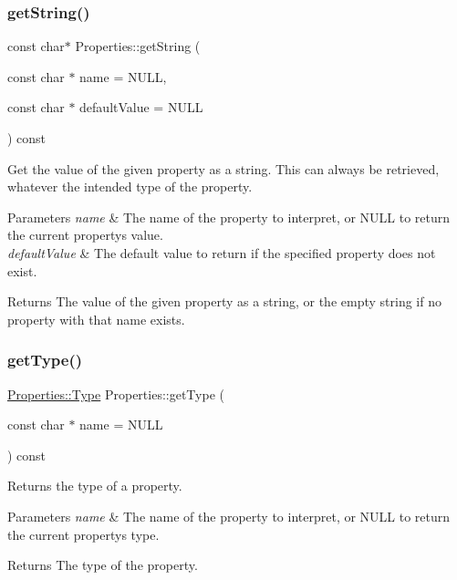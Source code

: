 \subsubsection{\texorpdfstring{get\+String()}{getString()}\hspace{0.1cm}{\footnotesize\ttfamily [2/2]}}
{\footnotesize\ttfamily const char$\ast$ Properties\+::get\+String (\begin{DoxyParamCaption}\item[{const char $\ast$}]{name = {\ttfamily NULL},  }\item[{const char $\ast$}]{default\+Value = {\ttfamily NULL} }\end{DoxyParamCaption}) const}

Get the value of the given property as a string. This can always be retrieved, whatever the intended type of the property.


\begin{DoxyParams}{Parameters}
{\em name} & The name of the property to interpret, or N\+U\+LL to return the current property\textquotesingle{}s value. \\
\hline
{\em default\+Value} & The default value to return if the specified property does not exist.\\
\hline
\end{DoxyParams}
\begin{DoxyReturn}{Returns}
The value of the given property as a string, or the empty string if no property with that name exists. 
\end{DoxyReturn}
\mbox{\label{classProperties_ab851dd2dc6b93048a988ecba9b5adc73}} 
\subsubsection{\texorpdfstring{get\+Type()}{getType()}\hspace{0.1cm}{\footnotesize\ttfamily [1/2]}}
{\footnotesize\ttfamily \hyperlink{classProperties_a2d14cc7f8d9f987905632969cc4070e9}{Properties\+::\+Type} Properties\+::get\+Type (\begin{DoxyParamCaption}\item[{const char $\ast$}]{name = {\ttfamily NULL} }\end{DoxyParamCaption}) const}

Returns the type of a property.


\begin{DoxyParams}{Parameters}
{\em name} & The name of the property to interpret, or N\+U\+LL to return the current property\textquotesingle{}s type.\\
\hline
\end{DoxyParams}
\begin{DoxyReturn}{Returns}
The type of the property. 
\end{DoxyReturn}
\mbox{\label{classProperties_ab8fd2fa0856600cb5c3894a6a2d2b3bc}} 
